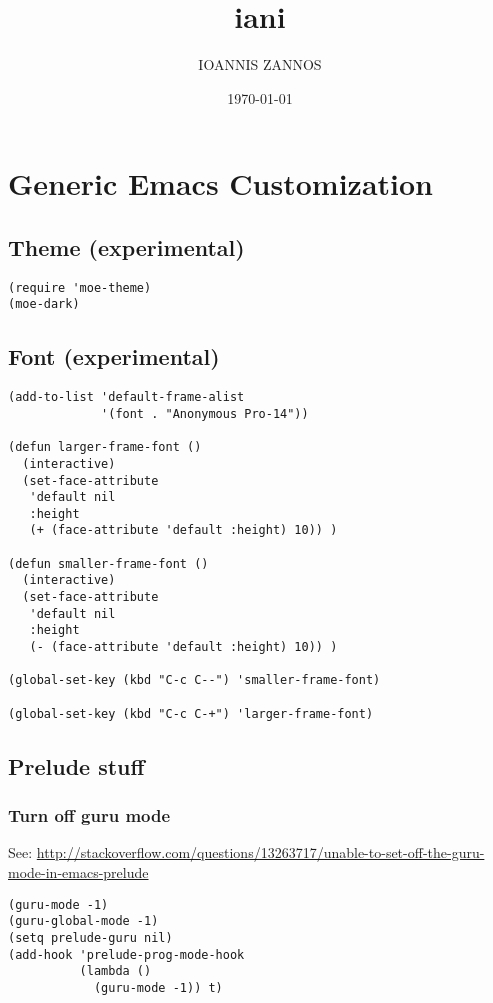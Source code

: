 \documentclass[nofonts]{tufte-handout}
\author{IOANNIS ZANNOS}
\date{\today}
\title{iani}
\begin{document}
\maketitle
\tableofcontents

\section{Generic Emacs Customization}
\label{sec-1}
\subsection{Theme (experimental)}
\label{sec-1-1}

\begin{verbatim}
(require 'moe-theme)
(moe-dark)
\end{verbatim}
\subsection{Font (experimental)}
\label{sec-1-2}

\begin{verbatim}
(add-to-list 'default-frame-alist
             '(font . "Anonymous Pro-14"))

(defun larger-frame-font ()
  (interactive)
  (set-face-attribute
   'default nil
   :height
   (+ (face-attribute 'default :height) 10)) )

(defun smaller-frame-font ()
  (interactive)
  (set-face-attribute
   'default nil
   :height
   (- (face-attribute 'default :height) 10)) )

(global-set-key (kbd "C-c C--") 'smaller-frame-font)

(global-set-key (kbd "C-c C-+") 'larger-frame-font)
\end{verbatim}

\subsection{Prelude stuff}
\label{sec-1-3}
\subsubsection{Turn off guru mode}
\label{sec-1-3-1}
See: \url{http://stackoverflow.com/questions/13263717/unable-to-set-off-the-guru-mode-in-emacs-prelude}

\begin{verbatim}
(guru-mode -1)
(guru-global-mode -1)
(setq prelude-guru nil)
(add-hook 'prelude-prog-mode-hook
          (lambda ()
            (guru-mode -1)) t)
\end{verbatim}
\end{document}
